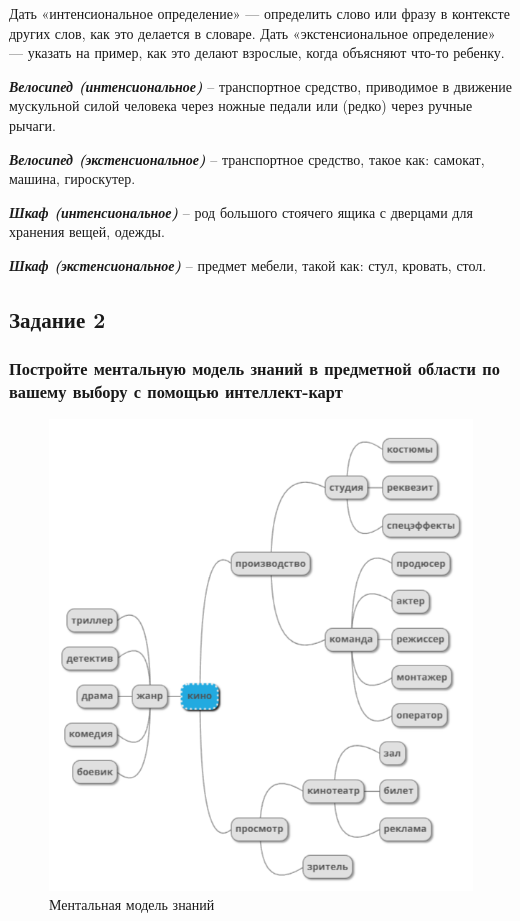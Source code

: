 \documentclass[14pt,a4paper,report]{report}
\begin{document}
Дать «интенсиональное определение» — определить слово или фразу в контексте других слов, как это делается в словаре. Дать «экстенсиональное определение» — указать на пример, как это делают взрослые, когда объясняют что-то ребенку.

\emph{\textbf{Велосипед (интенсиональное)}} -- транспортное средство, приводимое в движение мускульной силой человека через ножные педали или (редко) через ручные рычаги.

\emph{\textbf{Велосипед (экстенсиональное)}} -- транспортное средство, такое как: самокат, машина, гироскутер.

\emph{\textbf{Шкаф (интенсиональное)}} -- род большого стоячего ящика с дверцами для хранения вещей, одежды.

\emph{\textbf{Шкаф (экстенсиональное)}} -- предмет мебели, такой как: стул, кровать, стол.

\subsection{Задание 2}

\subsubsection{Постройте ментальную модель знаний в предметной области по вашему выбору с помощью интеллект-карт}

\begin{figure}[h!]
	\centering
	\includegraphics[scale = 0.92]{images/mindmap.png}
	\caption{Ментальная модель знаний}
	\label{image:1}
\end{figure}
\end{document}
